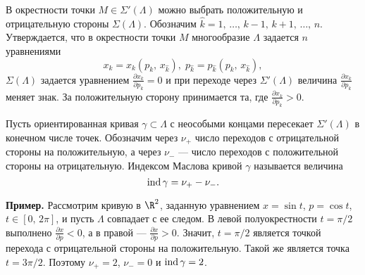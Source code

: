 \documentclass[a4paper
]{article}
\begin{document}
В окрестности точки $M\in \Sigma'(\Lambda)$ можно выбрать положительную
и отрицательную стороны $\Sigma(\Lambda)$. Обозначим $\hat k=1, \,
\dots, \, k-1, \, k+1, \, \dots, \, n$. Утверждается, что в окрестности
точки $M$ многообразие $\Lambda$ задается $n$ уравнениями $$x_k=x_k
(p_k, \, x_{\hat k}), \; p_{\hat k}=p_{\hat k}(p_k, \, x_{\hat k}),$$
$\Sigma(\Lambda)$ задается уравнением $\frac{\partial x_k}{\partial p_k}=0$
и при переходе через $\Sigma'(\Lambda)$ величина $\frac{\partial x_k}
{\partial p_k}$ меняет знак. За положительную сторону принимается та,
где $\frac{\partial x_k}{\partial p_k}>0$. \par
\begin{Def}
Пусть ориентированная кривая $\gamma\subset \Lambda$ с неособыми концами
пересекает $\Sigma'(\Lambda)$ в конечном числе точек. Обозначим через
$\nu_+$ число переходов с отрицательной стороны на положительную, а
через $\nu_-$ --- число переходов с положительной стороны на
отрицательную. Индексом Маслова кривой $\gamma$ называется величина
$${\rm ind}\, \gamma=\nu_+-\nu_-.$$
\end{Def}
{\bf Пример.} Рассмотрим кривую в $\R^2$, заданную уравнением
$x=\sin t$, $p=\cos t$, $t\in [0, \, 2\pi]$, и пусть $\Lambda$ совпадает
с ее следом. В левой полуокрестности $t=\pi/2$ выполнено $\frac{\partial
x}{\partial p}<0$, а в правой --- $\frac{\partial x}{\partial p}>0$. Значит,
$t=\pi/2$ является точкой перехода с отрицательной стороны на
положительную. Такой же является точка $t=3\pi/2$. Поэтому $\nu_+=2$,
$\nu_-=0$ и ${\rm ind}\, \gamma=2$.
\end{document}
